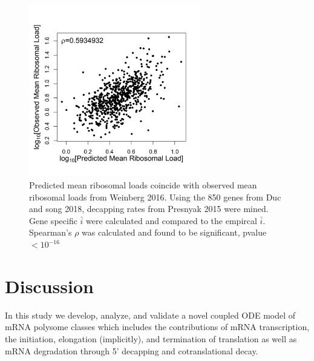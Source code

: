 \documentclass[a4,center,fleqn,nocrop]{NAR}
\newcommand{\MRL}{\ensuremath{\bar{i}}\xspace}
\begin{document}
\begin{figure}[!ht]
\begin{center}
\centering
\includegraphics[width=75mm]{Images/Duc_Song_vs_model_log.png}
\caption{Predicted mean ribosomal loads coincide with observed mean ribosomal loads from Weinberg 2016. Using the 850 genes from Duc and song 2018, decapping rates from Presnyak 2015 were mined. Gene specific \MRL were calculated and compared to the empircal \MRL. Spearman's $\rho$ was calculated and found to be significant, pvalue $<10^{-16}$}
\end{center}
\end{figure}



\section{Discussion}

In this study we develop, analyze, and validate a novel coupled ODE model of mRNA polysome classes %
which includes the contributions of mRNA transcription, the initiation, elongation (implicitly), and termination of translation as well as mRNA degradation through 5' decapping and cotranslational decay.
\end{document}
